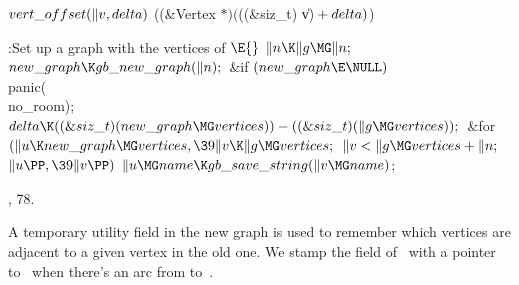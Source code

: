 \Y\B\4\D$\\{vert\_offset}(\|v,\\{delta})$ \5
((\&{Vertex} ${}{*})({}$((\&{siz\_t}) \|v)${}+\\{delta}){}$)\par
\Y\B\4:Set up a graph with the vertices of \X${}\E{}$\6
$\|n\K\|g\MG\|n;{}$\6
${}\\{new\_graph}\K\\{gb\_new\_graph}(\|n);{}$\6
\&{if} ${}(\\{new\_graph}\E\NULL){}$\1\5
\\{panic}(\\{no\_room});\2\6
${}\\{delta}\K((\&{siz\_t})(\\{new\_graph}\MG\\{vertices}))-((\&{siz\_t})(\|g%
\MG\\{vertices}));{}$\6
\&{for} ${}(\|u\K\\{new\_graph}\MG\\{vertices},\39\|v\K\|g\MG\\{vertices};{}$
${}\|v<\|g\MG\\{vertices}+\|n;{}$ ${}\|u\PP,\39\|v\PP){}$\1\5
${}\|u\MG\\{name}\K\\{gb\_save\_string}(\|v\MG\\{name}){}$;\2\par
{}, 78.\fi

A temporary utility field in the new graph is used to remember which
vertices are adjacent to a given vertex in the old one. We stamp the 
field of~ with a pointer to~ when there's an arc from 
to~.

